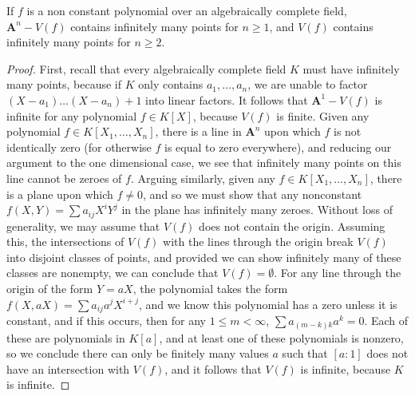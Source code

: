\begin{prop}
    If $f$ is a non constant polynomial over an algebraically complete field, $\mathbf{A}^n - V(f)$ contains infinitely many points for $n \geq 1$, and $V(f)$ contains infinitely many points for $n \geq 2$.
\end{prop}
\begin{proof}
    First, recall that every algebraically complete field $K$ must have infinitely many points, because if $K$ only contains $a_1, \dots, a_n$, we are unable to factor $(X - a_1) \dots (X - a_n) + 1$ into linear factors. It follows that $\mathbf{A}^1 - V(f)$ is infinite for any polynomial $f \in K[X]$, because $V(f)$ is finite. Given any polynomial $f \in K[X_1, \dots, X_n]$, there is a line in $\mathbf{A}^n$ upon which $f$ is not identically zero (for otherwise $f$ is equal to zero everywhere), and reducing our argument to the one dimensional case, we see that infinitely many points on this line cannot be zeroes of $f$. Arguing similarly, given any $f \in K[X_1, \dots, X_n]$, there is a plane upon which $f \neq 0$, and so we must show that any nonconstant $f(X,Y) = \sum a_{ij} X^i Y^j$ in the plane has infinitely many zeroes. Without loss of generality, we may assume that $V(f)$ does not contain the origin. Assuming this, the intersections of $V(f)$ with the lines through the origin break $V(f)$ into disjoint classes of points, and provided we can show infinitely many of these classes are nonempty, we can conclude that $V(f) = \emptyset$. For any line through the origin of the form $Y = aX$, the polynomial takes the form $f(X,aX) = \sum a_{ij} a^j X^{i+j}$, and we know this polynomial has a zero unless it is constant, and if this occurs, then for any $1 \leq m < \infty$, $\sum a_{(m-k)k} a^k = 0$. Each of these are polynomials in $K[a]$, and at least one of these polynomials is nonzero, so we conclude there can only be finitely many values $a$ such that $[a:1]$ does not have an intersection with $V(f)$, and it follows that $V(f)$ is infinite, because $K$ is infinite.
\end{proof}

